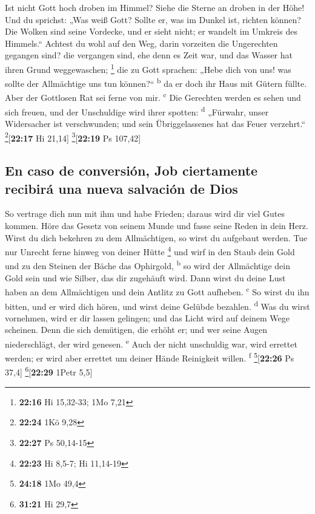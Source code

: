  Ist nicht Gott hoch droben im Himmel? Siehe die Sterne
an droben in der Höhe!  Und du sprichst: „Was weiß Gott?
Sollte er, was im Dunkel ist, richten können?  Die Wolken
sind seine Vordecke, und er sieht nicht; er wandelt im Umkreis des
Himmels.``  Achtest du wohl auf den Weg, darin vorzeiten
die Ungerechten gegangen sind?  die vergangen sind, ehe
denn es Zeit war, und das Wasser hat ihren Grund weggewaschen;
\footnote{\textbf{22:16} Hi 15,32-33; 1Mo 7,21}  die zu
Gott sprachen: „Hebe dich von uns! was sollte der Allmächtige uns tun
können?{}`` \textsuperscript{b}  da er doch ihr Haus mit
Gütern füllte. Aber der Gottlosen Rat sei ferne von mir.
\textsuperscript{c}  Die Gerechten werden es sehen und
sich freuen, und der Unschuldige wird ihrer spotten: \textsuperscript{d}
 „Fürwahr, unser Widersacher ist verschwunden; und sein
Übriggelassenes hat das Feuer verzehrt.`` \footnote{\textbf{22:24} 1Kö
  9,28}{[}\textbf{22:17} Hi 21,14{]} \footnote{\textbf{22:27} Ps
  50,14-15}{[}\textbf{22:19} Ps 107,42{]}

\hypertarget{en-caso-de-conversiuxf3n-job-ciertamente-recibiruxe1-una-nueva-salvaciuxf3n-de-dios}{%
\subsection{En caso de conversión, Job ciertamente recibirá una nueva
salvación de
Dios}\label{en-caso-de-conversiuxf3n-job-ciertamente-recibiruxe1-una-nueva-salvaciuxf3n-de-dios}}

 So vertrage dich nun mit ihm und habe Frieden; daraus
wird dir viel Gutes kommen.  Höre das Gesetz von seinem
Munde und fasse seine Reden in dein Herz.  Wirst du dich
bekehren zu dem Allmächtigen, so wirst du aufgebaut werden. Tue nur
Unrecht ferne hinweg von deiner Hütte \footnote{\textbf{22:23} Hi 8,5-7;
  Hi 11,14-19}  und wirf in den Staub dein Gold und zu
den Steinen der Bäche das Ophirgold, \textsuperscript{b} 
so wird der Allmächtige dein Gold sein und wie Silber, das dir zugehäuft
wird.  Dann wirst du deine Lust haben an dem Allmächtigen
und dein Antlitz zu Gott aufheben. \textsuperscript{c} 
So wirst du ihn bitten, und er wird dich hören, und wirst deine Gelübde
bezahlen. \textsuperscript{d}  Was du wirst vornehmen,
wird er dir lassen gelingen; und das Licht wird auf deinem Wege
scheinen.  Denn die sich demütigen, die erhöht er; und
wer seine Augen niederschlägt, der wird genesen. \textsuperscript{e}
 Auch der nicht unschuldig war, wird errettet werden; er
wird aber errettet um deiner Hände Reinigkeit willen.
\textsuperscript{f} \footnote{\textbf{24:18} 1Mo 49,4}{[}\textbf{22:26}
Ps 37,4{]} \footnote{\textbf{31:21} Hi 29,7}{[}\textbf{22:29} 1Petr
5,5{]}

